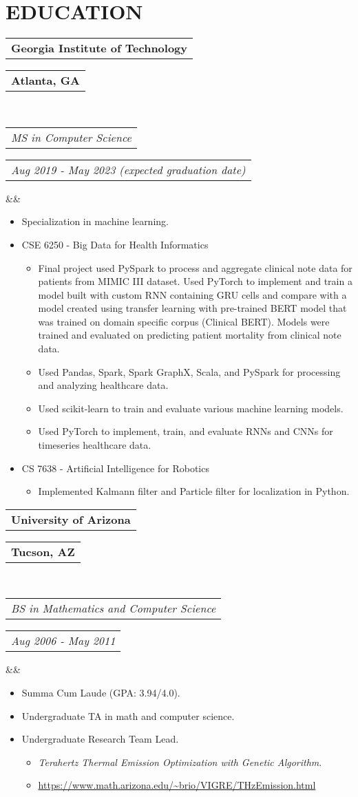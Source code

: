 \documentclass[11pt,a4paper,roman]{moderncv}
\makeatletter
\newcommand*{\customcventry}[7][.25em]{
  \begin{tabular}{@{}l}
    {\bfseries #4}
  \end{tabular}
  \hfill %
  \begin{tabular}{l@{}}
     {\bfseries #5}
  \end{tabular} \\
  \begin{tabular}{@{}l}
    {\itshape #3}
  \end{tabular}
  \hfill %
  \begin{tabular}{l@{}}
     {\itshape #2}
  \end{tabular}
  \ifx&#7&%
  \else{\\%
    \begin{minipage}{\maincolumnwidth}%
      \small#7%
    \end{minipage}}\fi%
  \par\addvspace{#1}}
\makeatother
\begin{document}
{{\section{EDUCATION}
{\customcventry{Aug 2019 - May 2023 (expected graduation date)}{MS in Computer Science}{Georgia Institute of Technology}{Atlanta, GA}
{}{}
{
\begin{itemize}
  \item Specialization in machine learning.
  \item CSE 6250 - Big Data for Health Informatics
  \begin{itemize}
  	\item Final project used PySpark to process and aggregate clinical note data for patients from MIMIC III dataset. Used PyTorch to implement and train a model built with custom RNN containing GRU cells and compare with a model created using transfer learning with pre-trained BERT model that was trained on domain specific corpus (Clinical BERT). Models were trained and evaluated on predicting patient mortality from clinical note data.
  	\item Used Pandas, Spark, Spark GraphX, Scala, and PySpark for processing and analyzing healthcare data.
  	\item Used scikit-learn to train and evaluate various machine learning models.
  	\item Used PyTorch to implement, train, and evaluate RNNs and CNNs for timeseries healthcare data.
  \end{itemize}
  \item CS 7638 - Artificial Intelligence for Robotics
  \begin{itemize}
  	\item Implemented Kalmann filter and Particle filter for localization in Python.
  \end{itemize}
 \end{itemize}
}

\vspace{12pt}

{\customcventry{Aug 2006 - May 2011}{BS in Mathematics and Computer Science}{University of Arizona}{Tucson, AZ}{}{}
{\begin{itemize}
  \item Summa Cum Laude (GPA: 3.94/4.0).
  \item Undergraduate TA in math and computer science.
  \item Undergraduate Research Team Lead.
  \begin{itemize}
    \item \textit{Terahertz Thermal Emission Optimization with Genetic Algorithm}.
    \item \url{https://www.math.arizona.edu/~brio/VIGRE/THzEmission.html}
  \end{itemize}
\end{itemize}
}

}}}}
\end{document}
